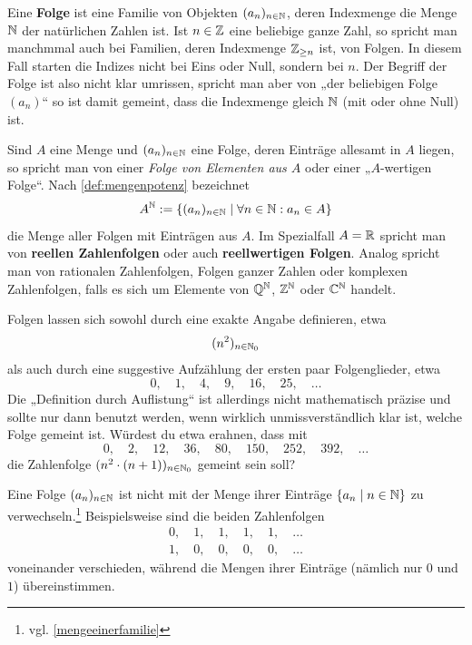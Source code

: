 \begin{de}[Folge] \label{def:folge} 
    Eine \textbf{Folge} ist eine Familie von Objekten $(a_n)_{n\in \mathbb N}$, deren Indexmenge die Menge $\mathbb N$ der natürlichen Zahlen ist. Ist $n\in \mathbb Z$ eine beliebige ganze Zahl, so spricht man manchmmal auch bei Familien, deren Indexmenge $\mathbb Z_{\ge n}$ ist, von Folgen. In diesem Fall starten die Indizes nicht bei Eins oder Null, sondern bei $n$. Der Begriff der Folge ist also nicht klar umrissen, spricht man aber von „der beliebigen Folge $(a_n)$“ so ist damit gemeint, dass die Indexmenge gleich $\mathbb N$ (mit oder ohne Null) ist.
    
    Sind $A$ eine Menge und $(a_n)_{n\in \mathbb N}$ eine Folge, deren Einträge allesamt in $A$ liegen, so spricht man von einer \emph{Folge von Elementen aus $A$} oder einer „$A$-wertigen Folge“. Nach \cref{def:mengenpotenz} bezeichnet
    \[ A^\mathbb N := \{ (a_n)_{n\in \mathbb N} \mid \forall n\in \mathbb N: a_n\in A \} \]
    die Menge aller Folgen mit Einträgen aus $A$. Im Spezialfall $A=\mathbb R$ spricht man von \textbf{reellen Zahlenfolgen} oder auch \textbf{reellwertigen Folgen}. Analog spricht man von rationalen Zahlenfolgen, Folgen ganzer Zahlen oder komplexen Zahlenfolgen, falls es sich um Elemente von $\mathbb Q^\mathbb N$, $\mathbb Z^\mathbb N$ oder $\mathbb C^\mathbb N$ handelt.
\end{de}


\begin{nota}
    Folgen lassen sich sowohl durch eine exakte Angabe definieren, etwa
    \begin{align*}
        (n^2)_{n\in \mathbb N_0}
    \end{align*}
    als auch durch eine suggestive Aufzählung der ersten paar Folgenglieder, etwa
        \[ 0,\quad 1,\quad 4,\quad 9,\quad 16,\quad 25,\quad\dots \]
    Die „Definition durch Auflistung“ ist allerdings nicht mathematisch präzise und sollte nur dann benutzt werden, wenn wirklich unmissverständlich klar ist, welche Folge gemeint ist. Würdest du etwa erahnen, dass mit
        \[ 0,\quad 2,\quad 12,\quad 36,\quad 80,\quad 150,\quad 252,\quad 392,\quad \dots\]
    die Zahlenfolge $(n^2\cdot (n+1))_{n\in \mathbb N_0}$ gemeint sein soll?
\end{nota}


\begin{bem}
    Eine Folge $(a_n)_{n\in \mathbb N}$ ist nicht mit der Menge ihrer Einträge $\{a_n\mid n\in \mathbb N\}$ zu verwechseln.\footnote{vgl. \cref{mengeeinerfamilie}} Beispielsweise sind die beiden Zahlenfolgen
    \begin{align*}
        0,\quad 1,\quad 1,\quad 1,\quad 1,\quad \dots \\
        1,\quad 0,\quad 0,\quad 0,\quad 0,\quad \dots 
    \end{align*}
    voneinander verschieden, während die Mengen ihrer Einträge (nämlich nur $0$ und $1$) übereinstimmen.
\end{bem}


